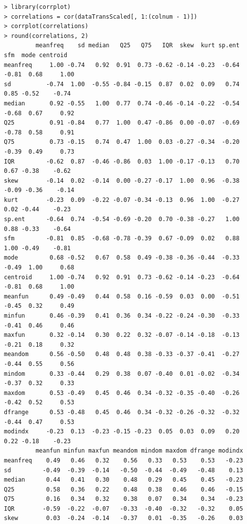 \documentclass{article}%
\begin{document}
\begin{verbatim}> library(corrplot)
> correlations = cor(dataTransScaled[, 1:(colnum - 1)])
> corrplot(correlations)
> round(correlations, 2)
         meanfreq    sd median   Q25   Q75   IQR  skew  kurt sp.ent   sfm  mode centroid
meanfreq     1.00 -0.74   0.92  0.91  0.73 -0.62 -0.14 -0.23  -0.64 -0.81  0.68     1.00
sd          -0.74  1.00  -0.55 -0.84 -0.15  0.87  0.02  0.09   0.74  0.85 -0.52    -0.74
median       0.92 -0.55   1.00  0.77  0.74 -0.46 -0.14 -0.22  -0.54 -0.68  0.67     0.92
Q25          0.91 -0.84   0.77  1.00  0.47 -0.86  0.00 -0.07  -0.69 -0.78  0.58     0.91
Q75          0.73 -0.15   0.74  0.47  1.00  0.03 -0.27 -0.34  -0.20 -0.39  0.49     0.73
IQR         -0.62  0.87  -0.46 -0.86  0.03  1.00 -0.17 -0.13   0.70  0.67 -0.38    -0.62
skew        -0.14  0.02  -0.14  0.00 -0.27 -0.17  1.00  0.96  -0.38 -0.09 -0.36    -0.14
kurt        -0.23  0.09  -0.22 -0.07 -0.34 -0.13  0.96  1.00  -0.27  0.02 -0.44    -0.23
sp.ent      -0.64  0.74  -0.54 -0.69 -0.20  0.70 -0.38 -0.27   1.00  0.88 -0.33    -0.64
sfm         -0.81  0.85  -0.68 -0.78 -0.39  0.67 -0.09  0.02   0.88  1.00 -0.49    -0.81
mode         0.68 -0.52   0.67  0.58  0.49 -0.38 -0.36 -0.44  -0.33 -0.49  1.00     0.68
centroid     1.00 -0.74   0.92  0.91  0.73 -0.62 -0.14 -0.23  -0.64 -0.81  0.68     1.00
meanfun      0.49 -0.49   0.44  0.58  0.16 -0.59  0.03  0.00  -0.51 -0.45  0.32     0.49
minfun       0.46 -0.39   0.41  0.36  0.34 -0.22 -0.24 -0.30  -0.33 -0.41  0.46     0.46
maxfun       0.32 -0.14   0.30  0.22  0.32 -0.07 -0.14 -0.18  -0.13 -0.21  0.18     0.32
meandom      0.56 -0.50   0.48  0.48  0.38 -0.33 -0.37 -0.41  -0.27 -0.44  0.55     0.56
mindom       0.33 -0.44   0.29  0.38  0.07 -0.40  0.01 -0.02  -0.34 -0.37  0.32     0.33
maxdom       0.53 -0.49   0.45  0.46  0.34 -0.32 -0.35 -0.40  -0.26 -0.42  0.52     0.53
dfrange      0.53 -0.48   0.45  0.46  0.34 -0.32 -0.26 -0.32  -0.32 -0.44  0.47     0.53
modindx     -0.23  0.13  -0.23 -0.15 -0.23  0.05  0.03  0.09   0.20  0.22 -0.18    -0.23
         meanfun minfun maxfun meandom mindom maxdom dfrange modindx
meanfreq    0.49   0.46   0.32    0.56   0.33   0.53    0.53   -0.23
sd         -0.49  -0.39  -0.14   -0.50  -0.44  -0.49   -0.48    0.13
median      0.44   0.41   0.30    0.48   0.29   0.45    0.45   -0.23
Q25         0.58   0.36   0.22    0.48   0.38   0.46    0.46   -0.15
Q75         0.16   0.34   0.32    0.38   0.07   0.34    0.34   -0.23
IQR        -0.59  -0.22  -0.07   -0.33  -0.40  -0.32   -0.32    0.05
skew        0.03  -0.24  -0.14   -0.37   0.01  -0.35   -0.26    0.03

\end{verbatim}
\end{document}
